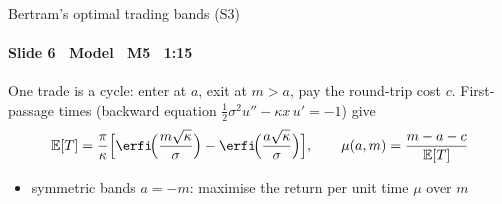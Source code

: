 \begin{frame}{Bertram's optimal trading bands (S3)}
\framesubtitle{Slide 6 \textbullet\ Model \textbullet\ M5 \textbullet\ 1:15}
\vspace{-2pt}
\normalsize\raggedright
One trade is a cycle: enter at $a$, exit at $m>a$, pay the round-trip cost $c$. First-passage times (backward equation $\tfrac12\sigma^2u''-\kappa x\,u'=-1$) give
{\normalsize\[ \mathbb{E}[T]=\frac{\pi}{\kappa}\Big[\erfi\!\Big(\frac{m\sqrt\kappa}{\sigma}\Big)-\erfi\!\Big(\frac{a\sqrt\kappa}{\sigma}\Big)\Big],\qquad
\mu(a,m)=\frac{m-a-c}{\mathbb{E}[T]} \]}
\begin{itemize}\setlength{\itemsep}{2pt}
  \item symmetric bands $a=-m$: maximise the return per unit time $\mu$ over $m$
\end{itemize}
\end{frame}
